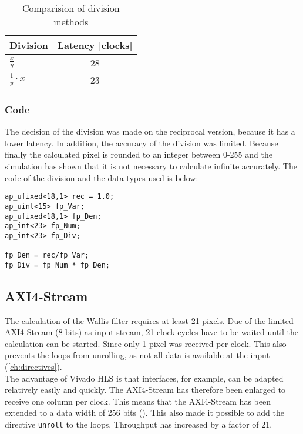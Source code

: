 \begin{table}[tb!]
    \centering
    \begin{tabular}{l c}
        \toprule
        Division & Latency [clocks]  \\
        \midrule
        $\frac{x}{y}$ & 28 
        \\
        $\frac{1}{y} \cdot x$ & 23 
        \\
        \bottomrule
    \end{tabular}
    \caption{Comparision of division methods}
    \label{tab:c_div}
\end{table}

\subsubsection*{Code}
The decision of the division was made on the reciprocal version, because it has a lower latency. In addition, the accuracy of the division was limited. Because finally the calculated pixel is rounded to an integer between 0-255 and the simulation has shown that it is not necessary to calculate infinite accurately. The code of the division and the data types used is below:

\begin{minipage}{\textwidth}
\begin{lstlisting}[style=CStyle, caption=Calculation of the division for the Wallis filter, label=lst:division]
ap_ufixed<18,1> rec = 1.0;
ap_uint<15> fp_Var;
ap_ufixed<18,1> fp_Den;
ap_int<23> fp_Num;
ap_int<23> fp_Div;

fp_Den = rec/fp_Var;
fp_Div = fp_Num * fp_Den;
\end{lstlisting}
\end{minipage}


\subsection{AXI4-Stream}
The calculation of the Wallis filter requires at least 21 pixels. Due of the limited AXI4-Stream (8 bits) as input stream, 21 clock cycles have to be waited until the calculation can be started. Since only 1 pixel was received per clock. This also prevents the loops from unrolling, as not all data is available at the input (\ref{ch:directives}). \\
The advantage of Vivado HLS is that interfaces, for example, can be adapted relatively easily and quickly. The AXI4-Stream has therefore been enlarged to receive one column per clock. This means that the AXI4-Stream has been extended to a data width of 256 bits (\cite{axi_stream}). This also made it possible to add the directive \texttt{unroll} to the loops. Throughput has increased by a factor of 21.


